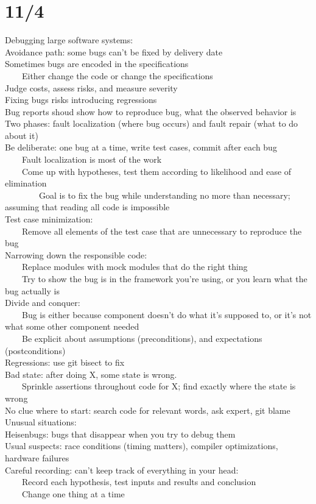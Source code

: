 \documentclass[10pt,letterpaper,unboxed,cm]{article}
\newcommand{\tab}{~~~~}
\begin{document}
\section{11/4}
Debugging large software systems:\\
Avoidance path: some bugs can't be fixed by delivery date\\
Sometimes bugs are encoded in the specifications\\
\tab Either change the code or change the specifications\\
Judge costs, assess risks, and measure severity\\
Fixing bugs risks introducing regressions\\
Bug reports shoud show how to reproduce bug, what the observed behavior is\\
Two phases: fault localization (where bug occurs) and fault repair (what to do about it)\\
Be deliberate: one bug at a time, write test cases, commit after each bug\\
\tab Fault localization is most of the work\\
\tab Come up with hypotheses, test them according to likelihood and ease of elimination\\
\tab \tab Goal is to fix the bug while understanding no more than necessary; assuming that reading all code is impossible\\
Test case minimization:\\
\tab Remove all elements of the test case that are unnecessary to reproduce the bug\\
Narrowing down the responsible code: \\
\tab Replace modules with mock modules that do the right thing\\
\tab Try to show the bug is in the framework you're using, or you learn what the bug actually is\\
Divide and conquer: \\
\tab Bug is either because component doesn't do what it's supposed to, or it's not what some other component needed\\
\tab Be explicit about assumptions (preconditions), and expectations (postconditions)\\
Regressions: use git bisect to fix\\
Bad state: after doing X, some state is wrong.\\
\tab Sprinkle assertions throughout code for X; find exactly where the state is wrong\\
No clue where to start: search code for relevant words, ask expert, git blame\\
Unusual situations:\\
Heisenbugs: bugs that disappear when you try to debug them\\
Usual suspects: race conditions (timing matters), compiler optimizations, hardware failures\\
Careful recording: can't keep track of everything in your head:\\
\tab Record each hypothesis, test inputs and results and conclusion\\
\tab Change one thing at a time\\
\end{document}
